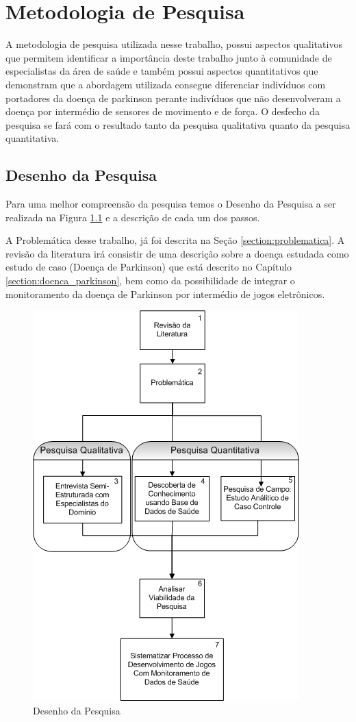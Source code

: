 \chapter{Metodologia de Pesquisa}
A metodologia de pesquisa utilizada nesse trabalho, possui aspectos qualitativos que permitem identificar a importância deste trabalho junto à comunidade de especialistas da área de saúde e também possui aspectos quantitativos que demonstram que a abordagem utilizada consegue diferenciar indivíduos com portadores da doença de parkinson perante indivíduos que não desenvolveram a doença por intermédio de sensores de movimento e de força. O desfecho da pesquisa se fará com o resultado tanto da pesquisa qualitativa quanto da pesquisa quantitativa.

\section{Desenho da Pesquisa} \label{sec:desenho_pesquisa}
Para uma melhor compreensão da pesquisa temos o Desenho da Pesquisa a ser realizada na Figura \ref{figure:desenho_pesquisa} e a descrição de cada um dos passos.


A Problemática desse trabalho, já foi descrita na Seção \ref{section:problematica}. A revisão da literatura irá consistir de uma descrição sobre a doença estudada como estudo de caso (Doença de Parkinson) que está descrito no Capítulo \ref{section:doenca_parkinson}, bem como da possibilidade de integrar o monitoramento da doença de Parkinson por intermédio de jogos eletrônicos. 


\begin{figure}[!htbp]
    \centering
    \includegraphics[width=.7\textwidth]{./img/metodologia-pesquisa.png}
    \caption{Desenho da Pesquisa}
    \label{figure:desenho_pesquisa}
\end{figure}

